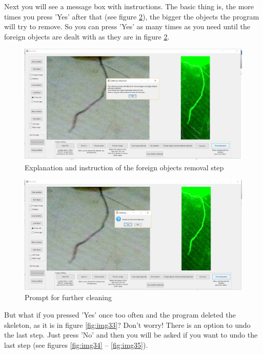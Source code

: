 Next you will see a message box with instructions. The basic thing is, the more times you press 'Yes' after that (see figure \ref{fig:img32}), the bigger the objects the program will try to remove.
So you can press 'Yes' as many times as you need until the foreign objects are dealt with as they are in figure \ref{fig:img32}.

\begin{figure}[H]
	\centering
	\includegraphics[width=\textwidth]{../Figures/manual/optionalA2.jpg}
	\caption{Explanation and instruction of the foreign objects removal step}
	\label{fig:img31}
\end{figure}

\begin{figure}[H]
	\centering
	\includegraphics[width=\textwidth]{../Figures/manual/optionalA3.jpg}
	\caption{Prompt for further cleaning}
	\label{fig:img32}
\end{figure}

But what if you pressed 'Yes' once too often and the program deleted the skeleton, as it is in figure \ref{fig:img33}? 
Don't worry! There is an option to undo the last step. 
Just press 'No' and then you will be asked if you want to undo the last step (see figures \ref{fig:img34} -- \ref{fig:img35}).

